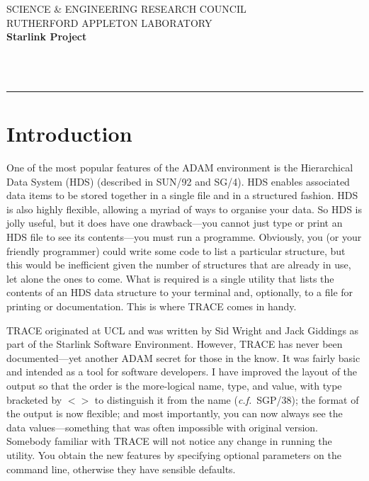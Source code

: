 \newcommand{\sstitem}{\item}



\thispagestyle{empty}
SCIENCE \& ENGINEERING RESEARCH COUNCIL \hfill \stardocname\\
RUTHERFORD APPLETON LABORATORY\\
{\large\bf Starlink Project\\}
{\large\bf \stardoccategory\ \stardocnumber}
\begin{flushright}
\stardocauthors\\
\stardocdate
\end{flushright}
\vspace{-4mm}
\rule{\textwidth}{0.5mm}
\vspace{5mm}
\begin{center}
{\Large\bf \stardoctitle}
\end{center}
\vspace{5mm}

\section{Introduction} One of the most popular features of the ADAM
environment is the Hierarchical Data System (HDS) (described in SUN/92
and SG/4).   HDS enables associated data items to be stored together in
a single file and in a structured fashion.  HDS is also highly flexible,
allowing a myriad of ways to organise your data.  So HDS is jolly
useful, but it does have one drawback---you cannot just type or print an
HDS file to see its contents---you must run a programme.  Obviously, you
(or your friendly programmer) could write some code to list a particular
structure, but this would be inefficient given the number of structures
that are already in use, let alone the ones to come.  What is required
is a single utility that lists the contents of an HDS data structure to
your terminal and, optionally, to a file for printing or documentation.
This is where {\small TRACE} comes in handy. 

{\small TRACE} originated at UCL and was written by Sid Wright and Jack
Giddings as part of the Starlink Software Environment. However, {\small
TRACE} has never been documented---yet another ADAM secret for those in
the know.  It was fairly basic and intended as a tool for software
developers.  I have improved the layout of the output so that the order
is the more-logical name, type, and value, with type bracketed by $<>$ to
distinguish it from the name ({\it c.f.}\ SGP/38); the format of the
output is now flexible;  and most importantly, you can now always see
the data values---something that was often impossible with original
version.  Somebody familiar with {\small TRACE} will not notice any
change in running the utility.  You obtain the new features by
specifying optional parameters on the command line, otherwise they have
sensible defaults. 


